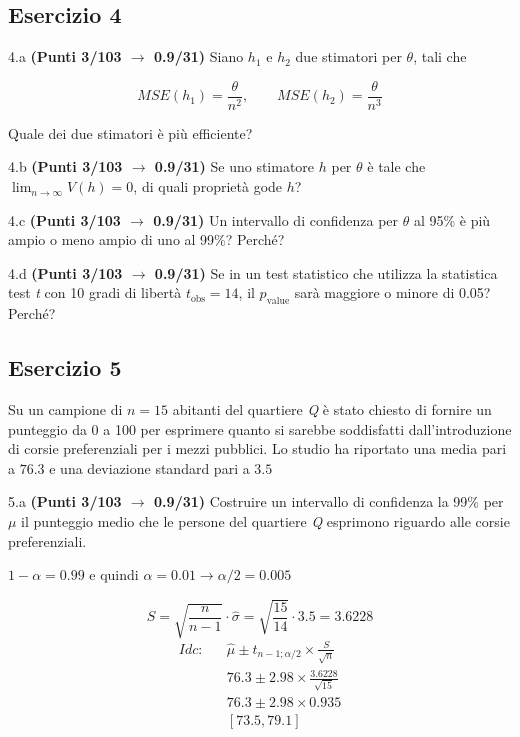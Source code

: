 \documentclass[
  11pt,
]{book}
\theoremstyle{mytheoremstyle}
\theoremstyle{mydefstyle}
\newenvironment{sol}
  {
  \begin{tcolorbox}[enhanced,breakable,arc=0.1mm,boxrule=1pt,colback=white,colframe=iblue,
  title=\bf \fontfamily{lmss}\selectfont \hspace{.5 cm} Soluzione,drop fuzzy shadow]

}{
\end{tcolorbox}
  }
\begin{document}
\subsection{Esercizio 4}\label{esercizio-4-14}

4.a \textbf{(Punti 3/103 \(\rightarrow\) 0.9/31)} Siano \(h_1\) e \(h_2\) due stimatori per \(\theta\), tali che

\[
MSE(h_1) =  \frac{\theta}{n^2}, \qquad MSE(h_2) =  \frac{\theta}{n^3}
\]

Quale dei due stimatori è più efficiente?

4.b \textbf{(Punti 3/103 \(\rightarrow\) 0.9/31)} Se uno stimatore \(h\) per \(\theta\) è tale che \(\lim_{n\to\infty}V(h)=0\), di quali proprietà gode \(h\)?

4.c \textbf{(Punti 3/103 \(\rightarrow\) 0.9/31)} Un intervallo di confidenza per \(\theta\) al 95\% è più ampio o meno ampio di uno al 99\%? Perché?

4.d \textbf{(Punti 3/103 \(\rightarrow\) 0.9/31)} Se in un test statistico che utilizza la statistica test \emph{t} con 10 gradi di libertà \(t_\text{obs}=14\), il \(p_\text{value}\) sarà maggiore o minore di 0.05? Perché?

\subsection{Esercizio 5}\label{esercizio-5-13}

Su un campione di \(n=15\) abitanti del quartiere \emph{Q} è stato chiesto di fornire un punteggio da 0 a 100 per esprimere quanto si sarebbe soddisfatti dall'introduzione di corsie preferenziali per i mezzi pubblici. Lo studio ha riportato una media pari a \(76.3\) e una deviazione standard pari a \(3.5\)

5.a \textbf{(Punti 3/103 \(\rightarrow\) 0.9/31)} Costruire un intervallo di confidenza la 99\% per \(\mu\) il punteggio medio che le persone del quartiere \emph{Q} esprimono riguardo alle corsie preferenziali.

\begin{sol}
\(1-\alpha =0.99\) e quindi \(\alpha=0.01\rightarrow \alpha/2=0.005\)

\[
      S  =\sqrt{\frac {n}{n-1}}\cdot\hat\sigma =
     \sqrt{\frac { 15 }{ 14 }}\cdot 3.5 = 3.6228 
\]
\begin{eqnarray*}
  Idc: & &  \hat\mu \pm  t_{n-1;\alpha/2} \times \frac{S}{\sqrt{n}} \\
     & &  76.3 \pm  2.98 \times \frac{ 3.6228 }{\sqrt{ 15 }} \\
     & &  76.3 \pm  2.98 \times  0.935 \\
     & & [ 73.5 ,  79.1 ]
\end{eqnarray*}

\end{sol}
\end{document}

